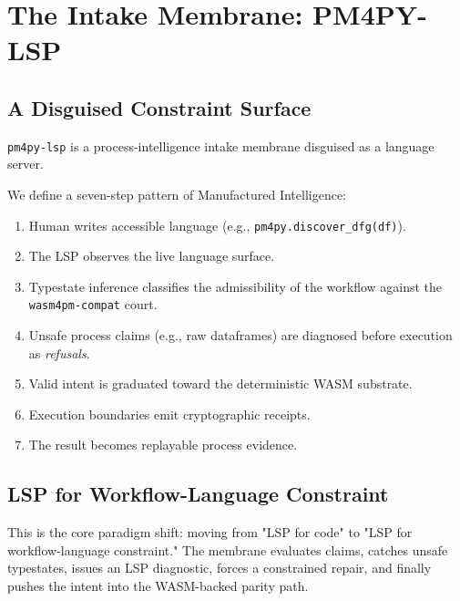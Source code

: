 
\chapter{The Intake Membrane: PM4PY-LSP}
\section{A Disguised Constraint Surface}
\texttt{pm4py-lsp} is a process-intelligence intake membrane disguised as a language server.

We define a seven-step pattern of Manufactured Intelligence:
\begin{enumerate}
    \item Human writes accessible language (e.g., \texttt{pm4py.discover\_dfg(df)}).
    \item The LSP observes the live language surface.
    \item Typestate inference classifies the admissibility of the workflow against the \texttt{wasm4pm-compat} court.
    \item Unsafe process claims (e.g., raw dataframes) are diagnosed before execution as \textit{refusals}.
    \item Valid intent is graduated toward the deterministic WASM substrate.
    \item Execution boundaries emit cryptographic receipts.
    \item The result becomes replayable process evidence.
\end{enumerate}

\section{LSP for Workflow-Language Constraint}
This is the core paradigm shift: moving from "LSP for code" to "LSP for workflow-language constraint." The membrane evaluates claims, catches unsafe typestates, issues an LSP diagnostic, forces a constrained repair, and finally pushes the intent into the WASM-backed parity path.
